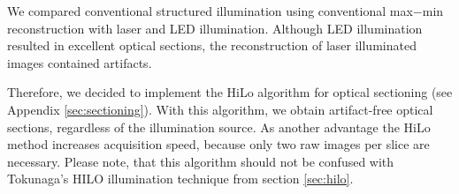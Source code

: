 We compared conventional structured illumination using conventional max$-$min
reconstruction with laser and LED illumination. Although LED
illumination resulted in excellent optical sections, the
reconstruction of laser illuminated images contained artifacts.


Therefore, we decided to implement the HiLo algorithm for optical sectioning (see Appendix \ref{sec:sectioning}). With
this algorithm, we obtain artifact-free optical sections, regardless
of the illumination source. As another advantage the HiLo method
increases acquisition speed, because only two raw images per slice are
necessary. Please note, that this algorithm should not be confused with Tokunaga's HILO illumination technique from section \ref{sec:hilo}.



     






